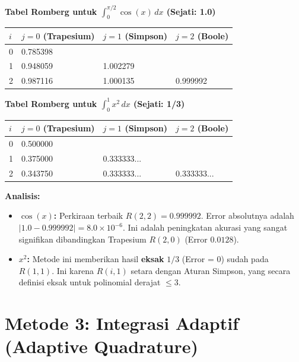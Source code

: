 \documentclass[a4paper, 11pt]{article} %
\begin{document}
\textbf{Tabel Romberg %
untuk $\int_0^{\pi/2} \cos(x) \, dx$ (Sejati: 1.0)} %
\begin{table}[H] %
\centering %
\begin{tabular}{llll} %
\toprule %
$i$ & $j=0$ (Trapesium) & $j=1$ (Simpson) & $j=2$ (Boole) \\ %
\midrule %
0 & 0.785398 & & \\ %
1 & 0.948059 & 1.002279 & \\ %
2 & 0.987116 & 1.000135 & 0.999992 \\ %
\bottomrule %
\end{tabular} %
\end{table} %

\textbf{Tabel Romberg untuk $\int_0^1 x^2 \, dx$ (Sejati: 1/3)} %
\begin{table}[H] %
\centering %
\begin{tabular}{llll} %
\toprule %
$i$ & $j=0$ (Trapesium) & $j=1$ (Simpson) & $j=2$ (Boole) \\ %
\midrule %
0 & 0.500000 & & \\ %
1 & 0.375000 & 0.333333... & \\ %
2 & 0.343750 & 0.333333... & 0.333333... \\ %
\bottomrule %
\end{tabular} %
\end{table} %

\textbf{Analisis:} %
\begin{itemize}
    \item \textbf{$\cos(x)$:} Perkiraan terbaik $R(2,2) = 0.999992$. %
    Error absolutnya adalah $|1.0 - 0.999992| = 8.0 \times 10^{-6}$. %
    Ini adalah peningkatan akurasi yang sangat signifikan dibandingkan Trapesium $R(2,0)$ (Error $0.0128$). %
    \item \textbf{$x^2$:} Metode ini memberikan hasil \textbf{eksak} $1/3$ (Error = 0) sudah pada $R(1,1)$. %
    Ini karena $R(i, 1)$ setara dengan Aturan Simpson, yang secara definisi eksak untuk polinomial derajat $\le 3$. %
\end{itemize}

\newpage %
\section{Metode 3: Integrasi Adaptif (Adaptive Quadrature)} %
\end{document}
